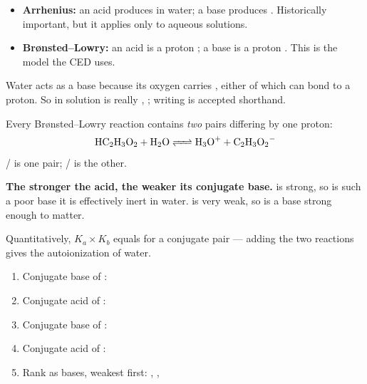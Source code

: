 \documentclass{apchem-notes}
\begin{document}


\begin{itemize}[leftmargin=*,itemsep=0.3em]
  \item \textbf{Arrhenius:} an acid produces  in
        water; a base produces . Historically
        important, but it applies only to aqueous solutions.
  \item \textbf{Br\o nsted--Lowry:} an acid is a proton
        ; a base is a proton
        . This is the model the CED uses.
\end{itemize}

Water acts as a base because its oxygen carries
, either of which can bond to a
proton. So  in solution is really , ;
writing  is accepted shorthand.


Every Br\o nsted--Lowry reaction contains \emph{two} pairs differing by one
proton:
\[ \ce{HC2H3O2 + H2O <=> H3O+ + C2H3O2^-} \]
/ is one pair; / is the other.

\begin{apctrap}
\textbf{The stronger the acid, the weaker its conjugate base.}  is
strong, so  is such a poor base it is effectively inert in water.
 is very weak, so  is a base strong enough to matter.

Quantitatively, $K_a \times K_b$ equals  for a
conjugate pair --- adding the two reactions gives the autoionization of
water.
\end{apctrap}


\begin{enumerate}[leftmargin=*,itemsep=0.3em]
  \item Conjugate base of : 
  \item Conjugate acid of : 
  \item Conjugate base of :
  \item Conjugate acid of : 
  \item Rank as bases, weakest first: , , 
\end{enumerate}
\end{document}
